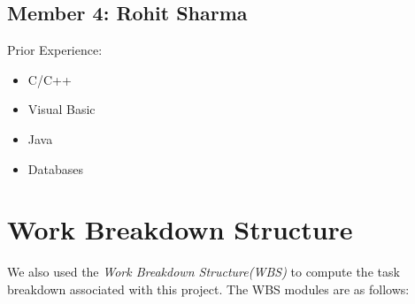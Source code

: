 \subsection{Member 4: Rohit Sharma}
Prior Experience:
\begin{itemize}
\item C/C++
\item Visual Basic
\item Java
\item Databases
\end{itemize}

\section{Work Breakdown Structure}
We also used the \emph{Work Breakdown Structure(WBS)} to compute the task breakdown associated with this project. The WBS modules are as follows: \newline
